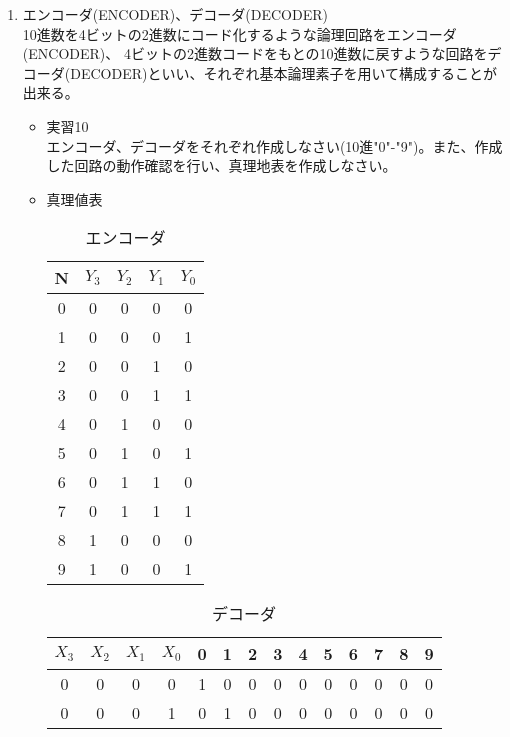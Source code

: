 \documentclass[dvipdfmx]{jsarticle}
\begin{document}
\begin{enumerate}
\begin{itemize}
\begin{table}[H]
								\end{table}
						\end{itemize}
					\item エンコーダ(ENCODER)、デコーダ(DECODER) \\
						10進数を4ビットの2進数にコード化するような論理回路をエンコーダ(ENCODER)、
						4ビットの2進数コードをもとの10進数に戻すような回路をデコーダ(DECODER)といい、それぞれ基本論理素子を用いて構成することが出来る。
						\begin{itemize}
							\item 実習10 \\
								エンコーダ、デコーダをそれぞれ作成しなさい(10進"0"-"9")。また、作成した回路の動作確認を行い、真理地表を作成しなさい。
							\item 真理値表
								\begin{table}[H]
								\center
								\caption{エンコーダ\label{tb:encoder}}
								\begin{tabular}{|c|c|c|c|c|}
									\hline
									N & $Y_3$ & $Y_2$ & $Y_1$ &$Y_0$ \\ \hline
									0 & 0 & 0 & 0 & 0 \\ \hline
									1 & 0 & 0 & 0 & 1\\ \hline
									2 & 0 & 0 & 1 & 0\\ \hline
									3 & 0 & 0 & 1 & 1\\ \hline
									4 & 0 & 1 & 0 & 0 \\ \hline
									5 & 0 & 1 & 0 & 1\\ \hline
									6 & 0 & 1 & 1 & 0\\ \hline
									7 & 0 & 1 & 1 & 1\\ \hline
									8 & 1 & 0 & 0 & 0\\ \hline
									9 & 1 & 0 & 0 & 1\\ \hline
								\end{tabular}
							\end{table}					
							\begin{table}[H]
								\center
								\caption{デコーダ\label{tb:encoder}}
								\begin{tabular}{|c|c|c|c|c|c|c|c|c|c|c|c|c|c|}
									\hline
									$X_3$ & $X_2$ & $X_1$ & $X_0$ & 0 & 1 & 2 & 3 & 4 & 5 & 6 & 7 & 8 & 9 \\ \hline
										0 &     0 &     0 &     0 & 1 & 0 & 0 & 0 & 0 & 0 & 0 & 0 & 0 & 0 \\ \hline
										0 &     0 &     0 &     1 & 0 & 1 & 0 & 0 & 0 & 0 & 0 & 0 & 0 & 0 \\ \hline

\end{tabular}
\end{table}
\end{itemize}
\end{enumerate}
\end{document}
